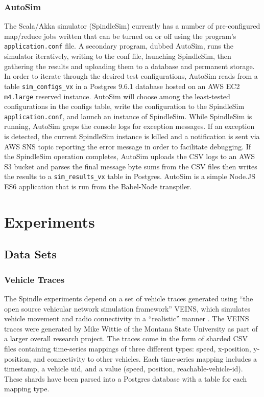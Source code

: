 \documentclass{thesis}
\begin{document}
\subsection{AutoSim}
    The Scala/Akka simulator (SpindleSim) currently has a number of pre-configured map/reduce jobs written
    that can be turned on or off using the program's \verb|application.conf| file. A secondary
    program, dubbed AutoSim, runs the simulator iteratively, writing to the conf file, launching
    SpindleSim, then gathering the results and uploading them to a database and permanent storage.
    In order to iterate through the desired test configurations, AutoSim reads from a table \verb|sim_configs_vx| in a 
    Postgres 9.6.1 database hosted on an AWS EC2 \verb|m4.large| reserved instance.
    AutoSim will choose among the least-tested configurations in the configs table, write the configuration to
    the SpindleSim \verb|application.conf|, and launch an instance of SpindleSim. While SpindleSim is running, AutoSim
    greps the console logs for exception messages. If an exception is detected, the current SpindleSim instance is killed
    and a notification is sent via AWS SNS topic reporting the error message in order to facilitate debugging. If the SpindleSim
    operation completes, AutoSim uploads the CSV logs to an AWS S3 bucket and parses the final message byte sums from the CSV
    files then writes the results to a \verb|sim_results_vx| table in Postgres. AutoSim is a simple Node.JS ES6 application
    that is run from the Babel-Node \cite{babel} transpiler.


\chapter{Experiments}
\section{Data Sets}
\subsection{Vehicle Traces}
   The Spindle experiments depend on a set of vehicle traces 
   generated using ``the open source vehicular network simulation framework'' VEINS, which simulates
   vehicle movement and radio connectivity in a ``realistic'' manner \cite{veins}. The VEINS traces
   were generated by Mike Wittie of the Montana State University as part of a larger overall research
   project. 
   The traces come in the form of sharded CSV files containing time-series mappings of three different types:
   speed, x-position, y-position, and connectivity to other vehicles. Each time-series mapping includes
   a timestamp, a vehicle uid, and a value (speed, position, reachable-vehicle-id). 
   These shards have been parsed into a Postgres database with a table for each mapping type.
\end{document}
